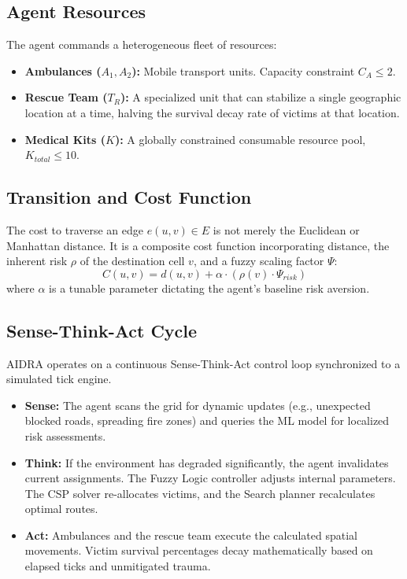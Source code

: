 \documentclass[conference]{IEEEtran}
\begin{document}
\subsection{Agent Resources}
The agent commands a heterogeneous fleet of resources:
\begin{itemize}
    \item \textbf{Ambulances ($A_1, A_2$):} Mobile transport units. Capacity constraint $C_{A} \leq 2$.
    \item \textbf{Rescue Team ($T_R$):} A specialized unit that can stabilize a single geographic location at a time, halving the survival decay rate of victims at that location.
    \item \textbf{Medical Kits ($K$):} A globally constrained consumable resource pool, $K_{total} \leq 10$.
\end{itemize}

\subsection{Transition and Cost Function}
The cost to traverse an edge $e(u,v) \in E$ is not merely the Euclidean or Manhattan distance. It is a composite cost function incorporating distance, the inherent risk $\rho$ of the destination cell $v$, and a fuzzy scaling factor $\Psi$:
\begin{equation}
    C(u, v) = d(u, v) + \alpha \cdot (\rho(v) \cdot \Psi_{risk})
\end{equation}
where $\alpha$ is a tunable parameter dictating the agent's baseline risk aversion.

\subsection{Sense-Think-Act Cycle}
AIDRA operates on a continuous Sense-Think-Act control loop synchronized to a simulated tick engine.
\begin{itemize}
    \item \textbf{Sense:} The agent scans the grid for dynamic updates (e.g., unexpected blocked roads, spreading fire zones) and queries the ML model for localized risk assessments.
    \item \textbf{Think:} If the environment has degraded significantly, the agent invalidates current assignments. The Fuzzy Logic controller adjusts internal parameters. The CSP solver re-allocates victims, and the Search planner recalculates optimal routes.
    \item \textbf{Act:} Ambulances and the rescue team execute the calculated spatial movements. Victim survival percentages decay mathematically based on elapsed ticks and unmitigated trauma.
\end{itemize}
\end{document}
